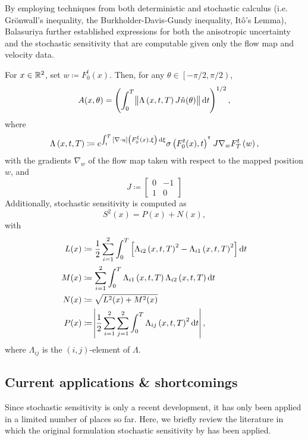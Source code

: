 By employing techniques from both deterministic and stochastic calculus (i.e. Gr\"onwall's inequality, the Burkholder-Davis-Gundy inequality, It\^o's Lemma), Balasuriya further established expressions for both the anisotropic uncertainty and the stochastic sensitivity that are computable given only the flow map and velocity data.

\begin{theorem}
	For \(x \in \mathbb{R}^2\), set \(w \coloneqq F_0^t(x)\).
	Then, for any \(\theta \in \left[-\pi/2, \pi/2\right)\),
	\[
		A(x,\theta) = \left(\int_0^T{\norm{\Lambda\left(x, t, T\right)J\hat{n}(\theta)}\dif t}\right)^{1/2},
	\]
	where
	\[
		\Lambda\left(x,t,T\right) \coloneqq e^{\int_t^T{\left[\nabla \cdot u\right]\left(F_0^\xi(x), \xi\right)\dif\xi}}\sigma\left(F_0^t(x), t\right)^{\T}J \nabla_w F_T^t\left(w\right),
	\]
	with the gradients \(\nabla_w\) of the flow map taken with respect to the mapped position \(w\), and
	\[
		J \coloneqq \begin{bmatrix}
			0 & -1 \\
			1 & 0
		\end{bmatrix}
	\]
	Additionally, stochastic sensitivity is computed as
	\[
		S^2(x) = P(x) + N(x),
	\]
	with
	\begin{align*}
		L(x) & \coloneqq \frac12\sum_{i=1}^2\int_0^T\left[\Lambda_{i2}\left(x,t, T\right)^2 - \Lambda_{i1}\left(x,t,T\right)^2\right]\dif t \\
		M(x) & \coloneqq \sum_{i=1}^2\int_0^T{\Lambda_{i1}\left(x,t,T\right)\Lambda_{i2}\left(x,t,T\right)\dif t}                           \\
		N(x) & \coloneqq \sqrt{L^2(x) + M^2(x)}                                                                                             \\
		P(x) & \coloneqq \abs{\frac12\sum_{i=1}^2\sum_{j=1}^2{\int_0^T{\Lambda_{ij}\left(x,t,T\right)^2\dif t}}},
	\end{align*}
	where \(\Lambda_{ij}\) is the \((i,j)\)-element of \(\Lambda\).
\end{theorem}


\subsection{Current applications \& shortcomings}
Since stochastic sensitivity is only a recent development, it has only been applied in a limited number of places so far.
Here, we briefly review the literature in which the original formulation stochastic sensitivity by \cite{Balasuriya_2020_StochasticSensitivityComputable} has been applied.

